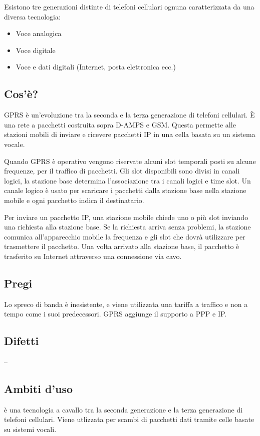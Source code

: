 Esistono tre generazioni distinte di telefoni cellulari ognuna caratterizzata da una diversa tecnologia:
\begin{itemize}
\item	Voce analogica
\item	Voce digitale
\item	Voce e dati digitali (Internet, posta elettronica ecc.)
\end{itemize}
\subsection{Cos'è?}
GPRS è un’evoluzione tra la seconda e la terza generazione di telefoni cellulari. È una rete a pacchetti costruita sopra D-AMPS e GSM. Questa permette alle stazioni mobili di inviare e ricevere pacchetti IP in una cella basata su un sistema vocale.

Quando GPRS è operativo vengono riservate alcuni slot temporali posti su alcune frequenze, per il traffico di pacchetti.
Gli slot disponibili sono divisi in canali logici, la stazione base determina l’associazione tra i canali logici e time slot. Un canale logico è usato per scaricare i pacchetti dalla stazione base nella stazione mobile e ogni pacchetto indica il destinatario.

Per inviare un pacchetto IP, una stazione mobile chiede uno o più slot inviando una richiesta alla stazione base. Se la richiesta arriva senza problemi, la stazione comunica all’apparecchio mobile la frequenza e gli slot che dovrà utilizzare per trasmettere il pacchetto. Una volta arrivato alla stazione base, il pacchetto è trasferito su Internet attraverso una connessione via cavo.

\subsection{Pregi}
Lo spreco di banda è inesistente, e viene utilizzata una tariffa a traffico e non a tempo come i suoi predecessori.
GPRS aggiunge il supporto a PPP e IP.

\subsection{Difetti}
--
\subsection{Ambiti d'uso}
è una tecnologia a cavallo tra la seconda generazione e la terza generazione di telefoni cellulari. Viene utlizzata per scambi di pacchetti dati tramite celle basate su sistemi vocali.
